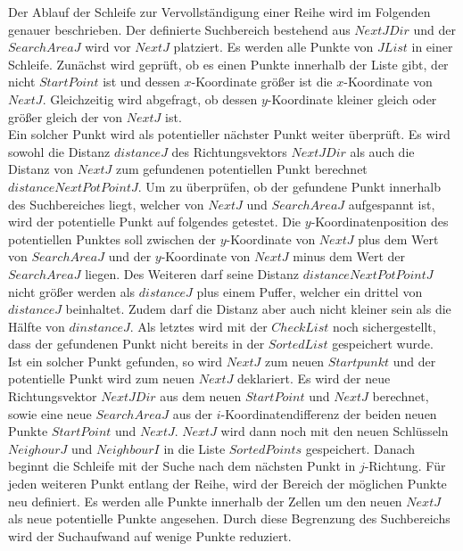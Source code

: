 Der Ablauf der Schleife zur Vervollständigung einer Reihe wird im Folgenden genauer beschrieben. Der definierte Suchbereich bestehend aus $NextJDir$ und der $SearchAreaJ$ wird vor $NextJ$ platziert. Es werden alle Punkte von $JList$ in einer Schleife. Zunächst wird geprüft, ob es einen Punkte innerhalb der Liste gibt, der nicht $StartPoint$ ist und dessen $x$-Koordinate größer ist die $x$-Koordinate von $NextJ$. Gleichzeitig wird abgefragt, ob dessen $y$-Koordinate kleiner gleich oder größer gleich der von $NextJ$ ist.\\

Ein solcher Punkt wird als potentieller nächster Punkt weiter überprüft. Es wird sowohl die Distanz $distanceJ$ des Richtungsvektors $NextJDir$ als auch die Distanz von $NextJ$ zum gefundenen potentiellen Punkt berechnet $distanceNextPotPointJ$. Um zu überprüfen, ob der gefundene Punkt innerhalb des Suchbereiches liegt, welcher von $NextJ$ und $SearchAreaJ$ aufgespannt ist, wird der potentielle Punkt auf folgendes getestet. Die $y$-Koordinatenposition des potentiellen Punktes soll zwischen der $y$-Koordinate von $NextJ$ plus dem Wert von $SearchAreaJ$ und der $y$-Koordinate von $NextJ$ minus dem Wert der $SearchAreaJ$ liegen. Des Weiteren darf seine Distanz $distanceNextPotPointJ$ nicht größer werden als $distanceJ$ plus einem Puffer, welcher ein drittel von $distanceJ$ beinhaltet. Zudem darf die Distanz aber auch nicht kleiner sein als die Hälfte von $dinstanceJ$. Als letztes wird mit der $CheckList$ noch sichergestellt, dass der gefundenen Punkt nicht bereits in der $SortedList$ gespeichert wurde.\\

Ist ein solcher Punkt gefunden, so wird $NextJ$ zum neuen $Startpunkt$ und der potentielle Punkt wird zum neuen $NextJ$ deklariert. Es wird der neue Richtungsvektor $NextJDir$ aus dem neuen $StartPoint$ und $NextJ$ berechnet, sowie eine neue $SearchAreaJ$ aus der $i$-Koordinatendifferenz der beiden neuen Punkte $StartPoint$ und $NextJ$. $NextJ$ wird dann noch mit den neuen Schlüsseln $NeighourJ$ und $NeighbourI$ in die Liste $SortedPoints$ gespeichert. Danach beginnt die Schleife mit der Suche nach dem nächsten Punkt in $j$-Richtung. Für jeden weiteren Punkt entlang der Reihe, wird der Bereich der möglichen Punkte neu definiert. Es werden alle Punkte innerhalb der Zellen um den neuen $NextJ$ als neue potentielle Punkte angesehen. Durch diese Begrenzung des Suchbereichs wird der Suchaufwand auf wenige Punkte reduziert. \\

